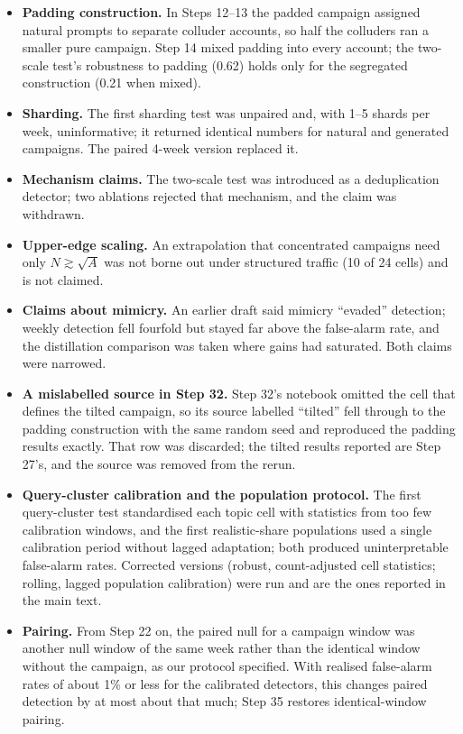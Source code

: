 
\begin{itemize}
\item \textbf{Padding construction.} In Steps 12--13 the padded campaign assigned natural prompts to separate colluder accounts, so half the colluders ran a smaller pure campaign. Step 14 mixed padding into every account; the two-scale test's robustness to padding (0.62) holds only for the segregated construction (0.21 when mixed).
\item \textbf{Sharding.} The first sharding test was unpaired and, with 1--5 shards per week, uninformative; it returned identical numbers for natural and generated campaigns. The paired 4-week version replaced it.
\item \textbf{Mechanism claims.} The two-scale test was introduced as a deduplication detector; two ablations rejected that mechanism, and the claim was withdrawn.
\item \textbf{Upper-edge scaling.} An extrapolation that concentrated campaigns need only $N\gtrsim\sqrt A$ was not borne out under structured traffic (10 of 24 cells) and is not claimed.
\item \textbf{Claims about mimicry.} An earlier draft said mimicry ``evaded'' detection; weekly detection fell fourfold but stayed far above the false-alarm rate, and the distillation comparison was taken where gains had saturated. Both claims were narrowed.
\item \textbf{A mislabelled source in Step 32.} Step 32's notebook omitted the cell that defines the tilted campaign, so its source labelled ``tilted'' fell through to the padding construction with the same random seed and reproduced the padding results exactly. That row was discarded; the tilted results reported are Step 27's, and the source was removed from the rerun.
\item \textbf{Query-cluster calibration and the population protocol.} The first query-cluster test standardised each topic cell with statistics from too few calibration windows, and the first realistic-share populations used a single calibration period without lagged adaptation; both produced uninterpretable false-alarm rates. Corrected versions (robust, count-adjusted cell statistics; rolling, lagged population calibration) were run and are the ones reported in the main text.
\item \textbf{Pairing.} From Step 22 on, the paired null for a campaign window was another null window of the same week rather than the identical window without the campaign, as our protocol specified. With realised false-alarm rates of about 1\% or less for the calibrated detectors, this changes paired detection by at most about that much; Step 35 restores identical-window pairing.

\end{itemize}
